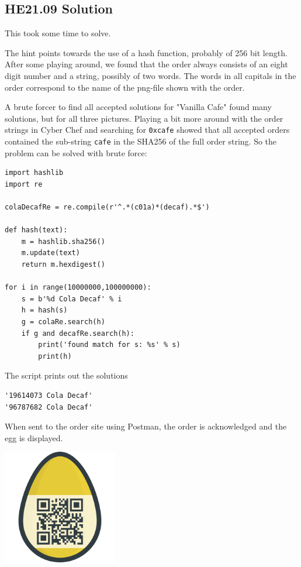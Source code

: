\documentclass[english,a4paper,nols,noindent]{tufte-handout}
\begin{document}
\hypertarget{he21.09-solution}{%
\subsection{HE21.09 Solution}\label{he21.09-solution}}

This took some time to solve.

The hint points towards the use of a hash function, probably of 256 bit length.
After some playing around, we found that the order always consists of an eight
digit number and a string, possibly of two words.  The words in all capitals in
the order correspond to the name of the png-file shown with the order.

A brute forcer to find all accepted solutions for "Vanilla Cafe" found many
solutions, but for all three pictures.  Playing a bit more around with the
order strings in Cyber Chef and searching for \verb+0xcafe+ showed that all
accepted orders contained the sub-string \verb+cafe+ in the SHA256 of the full
order string.  So the problem can be solved with brute force:

\begin{verbatim}
import hashlib
import re

colaDecafRe = re.compile(r'^.*(c01a)*(decaf).*$')

def hash(text):
    m = hashlib.sha256()
    m.update(text)
    return m.hexdigest()

for i in range(10000000,100000000):
    s = b'%d Cola Decaf' % i
    h = hash(s)
    g = colaRe.search(h)
    if g and decafRe.search(h):
        print('found match for s: %s' % s)
        print(h)
\end{verbatim}

The script prints out the solutions
\begin{verbatim}
'19614073 Cola Decaf'
'96787682 Cola Decaf'
\end{verbatim}

When sent to the order site using Postman, the order is acknowledged and the
egg is displayed.

\begin{marginfigure}
    \includegraphics[width=50mm]{ch09/7ef384aa6ec128ef.png}
\end{marginfigure}
\end{document}

